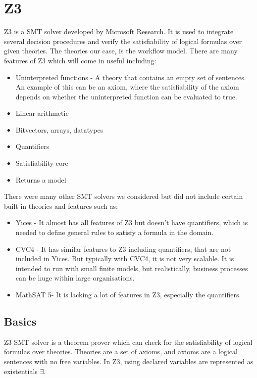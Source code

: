 \documentclass[a4paper]{report}
\begin{document}
\section{Z3}
Z3\cite{smt} is a SMT solver developed by Microsoft Research. It is used to integrate several decision procedures and verify the satisfiability of logical formulas over given theories. The theories our case, is the workflow model. There are many features of Z3 which will come in useful including:
\begin{itemize}
\item Uninterpreted functions - A theory that contains an empty set of sentences. An example of this can be an axiom, where the satisfiability of the axiom depends on whether the uninterpreted function can be evaluated to true.
\item Linear arithmetic
\item Bitvectors, arrays, datatypes
\item Quantifiers
\item Satisfiability core
\item Returns a model
\end{itemize}

There were many other SMT solvers we considered but did not include certain built in theories and features such as:
\begin{itemize}
\item Yices\cite{yices} - It almost has all features of Z3 but doesn’t have quantifiers, which is needed to define general rules to satisfy a formula in the domain. 
\item CVC4\cite{cvc4} - It has similar features to Z3 including quantifiers, that are not included in Yices. But typically with CVC4, it is not very scalable. It is intended to run with small finite models, but realistically, business processes can be huge within large organisations.
\item MathSAT 5\cite{mathsat5}- It is lacking a lot of features in Z3, especially the quantifiers.
\end{itemize}

\subsection{Basics}
Z3 SMT solver is a theorem prover which can check for the satisfiability of logical formulas over theories. Theories are a set of axioms, and axioms are a logical sentences with no free variables. In Z3, using declared variables are represented as existentials $\exists$.\\
\end{document}
